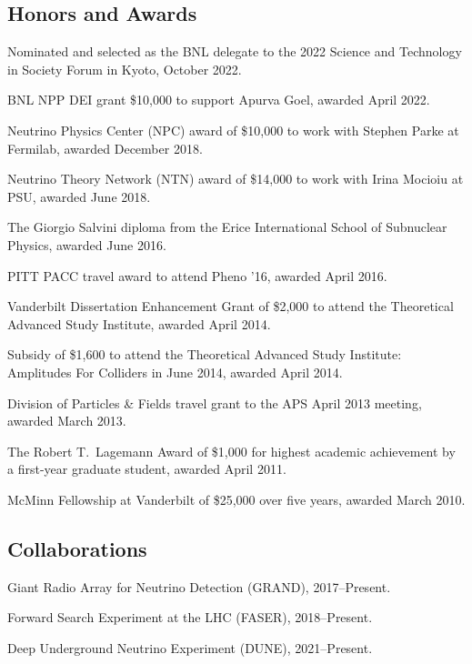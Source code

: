 \documentclass{article}
\renewenvironment{itemize}{
\begin{list}{}{
\setlength{\leftmargin}{.5em}}}{
\end{list}}
\begin{document}
\subsection*{Honors and Awards}
\begin{itemize}
\item Nominated and selected as the BNL delegate to the 2022 Science and Technology in Society Forum in Kyoto, October 2022.
\item BNL NPP DEI grant \$10,000 to support Apurva Goel, awarded April 2022.
\item Neutrino Physics Center (NPC) award of \$10,000 to work with Stephen Parke at Fermilab, awarded December 2018.
\item Neutrino Theory Network (NTN) award of \$14,000 to work with Irina Mocioiu at PSU, awarded June 2018.
\item The Giorgio Salvini diploma from the Erice International School of Subnuclear Physics, awarded June 2016.
\item PITT PACC travel award to attend Pheno '16, awarded April 2016.
\item Vanderbilt Dissertation Enhancement Grant of \$2,000 to attend the Theoretical Advanced Study Institute, awarded April 2014.
\item Subsidy of \$1,600 to attend the Theoretical Advanced Study Institute: Amplitudes For Colliders in June 2014, awarded April 2014.
\item Division of Particles \& Fields travel grant to the APS April 2013 meeting, awarded March 2013.
\item The Robert T.~Lagemann Award of \$1,000 for highest academic achievement by a first-year graduate student, awarded April 2011.
\item McMinn Fellowship at Vanderbilt of \$25,000 over five years, awarded March 2010.
\end{itemize}

\subsection*{Collaborations}
\begin{itemize}
\item Giant Radio Array for Neutrino Detection (GRAND), 2017--Present.
\item Forward Search Experiment at the LHC (FASER), 2018--Present.
\item Deep Underground Neutrino Experiment (DUNE), 2021--Present.
\end{itemize}
\end{document}
